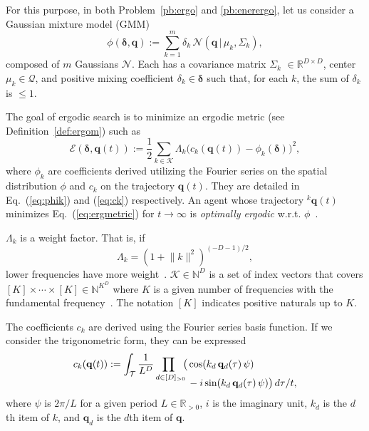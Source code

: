 \documentclass[letterpaper,10pt,conference,twoside]{IEEEtran}
\theoremstyle{definition}
\begin{document}
For this purpose, in both Problem~\ref{pb:ergo} and \ref{pb:enerergo}, let us consider a Gaussian mixture model (GMM)
\begin{equation}\label{eq:gmm}
  \phi(\boldsymbol{\delta},\mathbf{q}):=\sum_{k=1}^{m}\delta_k\,\mathcal{N}(\mathbf{q}\,|\,\mu_k,\Sigma_k),
\end{equation} 
composed of $m$ Gaussians $\mathcal{N}$. Each has a covariance matrix ${\Sigma_k}$ $\in\mathbb{R}^{D\times D}$, center $\mu_k\in\mathcal{Q}$, and positive mixing coefficient $\delta_k\in\boldsymbol{\delta}$ such that, for each $k$, the sum of $\delta_k$ is $\leq 1$. %

The goal of ergodic search is to minimize an ergodic metric (see Definition~\ref{def:ergom}) such as~\cite{mathew2011metrics}
\begin{equation}\label{eq:ergmetric}
  \mathcal{E}(\boldsymbol{\delta},\mathbf{q}(t)):=\frac{1}{2}\sum_{k\in\mathcal{K}}\Lambda_k \big( c_k(\mathbf{q}(t))-\phi_k(\boldsymbol{\delta}) \big)^2,
\end{equation}
where $\phi_k$ are coefficients derived utilizing the Fourier series on the spatial distribution $\phi$ and $c_k$ on the trajectory $\mathbf{q}(t)$. They are detailed in Eq.~(\ref{eq:phik}) and (\ref{eq:ck}) respectively.
An agent whose trajectory ${}^k\mathbf{q}(t)$ minimizes Eq.~(\ref{eq:ergmetric}) for $t\rightarrow\infty$ is \textit{optimally ergodic} w.r.t. $\phi$~\cite{abraham2018decentralized}. 

$\Lambda_k$ is a weight factor. That is, if 
\begin{equation}
  \Lambda_k=(1+\lVert k\rVert^2)^{(-D-1)/2},
\end{equation}
lower frequencies have more weight~\cite{miller2016ergodic}.
$\mathcal{K}\in\mathbb{N}^D$ is a set of index vectors that covers $[K]\times\cdots\times[K]\in\mathbb{N}^{K^D}$ 
where $K$ is a given number of frequencies with the fundamental frequency~\cite{calinon2020mixture}. The notation $[K]$ indicates positive naturals up to $K$.

The coefficients $c_k$ are derived using the Fourier series basis function. If we consider the trigonometric form, they can be expressed
\begin{equation}\label{eq:ck}
  \begin{split}
    c_k(\mathbf{q}(t)):=\int_{\mathcal{T}}\frac{1}{L^D}\prod_{d\in[D]_{>0}\hspace*{-1ex}}\big(& \cos(k_d\,\mathbf{q}_d(\tau)\,\psi)\\[-2ex]
    &\vspace*{-4ex}-i\sin(k_d\,\mathbf{q}_d(\tau)\,\psi) \big)\,d\tau/t,
  \end{split}
\end{equation}
where $\psi$ is $2\pi/L$ for a given period $L\in\mathbb{R}_{>0}$, $i$ is the imaginary unit, $k_d$ is the $d$th item of $k$, and $\mathbf{q}_d$ is the $d$th item of $\mathbf{q}$.
\end{document}
